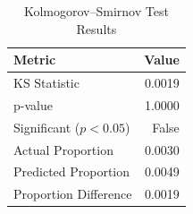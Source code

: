 \begin{table}[H]
    \centering
    \caption{Kolmogorov--Smirnov Test Results}
    \label{tb:ks-test}
    \begin{tabular}{lr}
    \toprule
    \textbf{Metric} & \textbf{Value} \\
    \midrule
    KS Statistic & 0.0019 \\
    p-value & 1.0000 \\
    Significant ($p < 0.05$) & False \\
    Actual Proportion & 0.0030 \\
    Predicted Proportion & 0.0049 \\
    Proportion Difference & 0.0019 \\
    \bottomrule
    \end{tabular}
\end{table}






